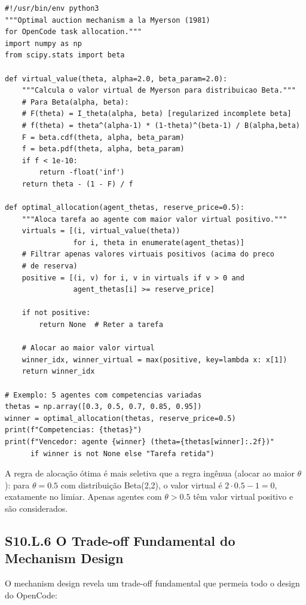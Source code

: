 \begin{verbatim}
#!/usr/bin/env python3
"""Optimal auction mechanism a la Myerson (1981)
for OpenCode task allocation."""
import numpy as np
from scipy.stats import beta

def virtual_value(theta, alpha=2.0, beta_param=2.0):
    """Calcula o valor virtual de Myerson para distribuicao Beta."""
    # Para Beta(alpha, beta):
    # F(theta) = I_theta(alpha, beta) [regularized incomplete beta]
    # f(theta) = theta^(alpha-1) * (1-theta)^(beta-1) / B(alpha,beta)
    F = beta.cdf(theta, alpha, beta_param)
    f = beta.pdf(theta, alpha, beta_param)
    if f < 1e-10:
        return -float('inf')
    return theta - (1 - F) / f

def optimal_allocation(agent_thetas, reserve_price=0.5):
    """Aloca tarefa ao agente com maior valor virtual positivo."""
    virtuals = [(i, virtual_value(theta))
                for i, theta in enumerate(agent_thetas)]
    # Filtrar apenas valores virtuais positivos (acima do preco
    # de reserva)
    positive = [(i, v) for i, v in virtuals if v > 0 and
                agent_thetas[i] >= reserve_price]

    if not positive:
        return None  # Reter a tarefa

    # Alocar ao maior valor virtual
    winner_idx, winner_virtual = max(positive, key=lambda x: x[1])
    return winner_idx

# Exemplo: 5 agentes com competencias variadas
thetas = np.array([0.3, 0.5, 0.7, 0.85, 0.95])
winner = optimal_allocation(thetas, reserve_price=0.5)
print(f"Competencias: {thetas}")
print(f"Vencedor: agente {winner} (theta={thetas[winner]:.2f})"
      if winner is not None else "Tarefa retida")
\end{verbatim}

A regra de alocação ótima é mais seletiva que a regra ingênua (alocar ao maior $\theta$): para $\theta = 0.5$ com distribuição Beta(2,2), o valor virtual é $2 \cdot 0.5 - 1 = 0$, exatamente no limiar. Apenas agentes com $\theta > 0.5$ têm valor virtual positivo e são considerados.

\subsection*{S10.L.6 O Trade-off Fundamental do Mechanism Design}

O mechanism design revela um trade-off fundamental que permeia todo o design do OpenCode:

